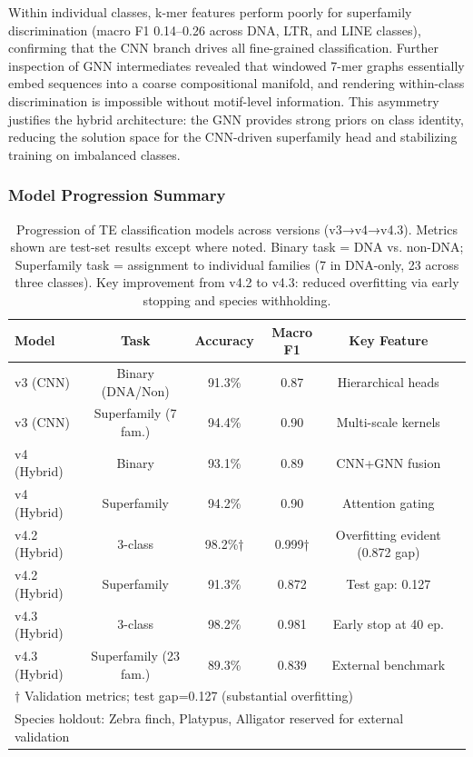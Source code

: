 \documentclass[12pt]{article}
\begin{document}
Within individual classes, k-mer features perform poorly for superfamily discrimination (macro F1 0.14--0.26 across DNA, LTR, and LINE classes), confirming that the CNN branch drives all fine-grained classification. Further inspection of GNN intermediates revealed that windowed 7-mer graphs essentially embed sequences into a coarse compositional manifold, and rendering within-class discrimination is impossible without motif-level information. This asymmetry justifies the hybrid architecture: the GNN provides strong priors on class identity, reducing the solution space for the CNN-driven superfamily head and stabilizing training on imbalanced classes.

\iffalse

\clearpage
\subsubsection{Model Progression Summary}

\FloatBarrier
\begin{table}[H]
\centering
\begin{tabular}{lccccc}
\hline
Model & Task & Accuracy & Macro F1 & Key Feature \\
\hline
v3 (CNN) & Binary (DNA/Non) & 91.3\% & 0.87 & Hierarchical heads \\
v3 (CNN) & Superfamily (7 fam.) & 94.4\% & 0.90 & Multi-scale kernels \\
v4 (Hybrid) & Binary & 93.1\% & 0.89 & CNN+GNN fusion \\
v4 (Hybrid) & Superfamily & 94.2\% & 0.90 & Attention gating \\
v4.2 (Hybrid) & 3-class & 98.2\%† & 0.999†  & Overfitting evident (0.872 gap) \\
v4.2 (Hybrid) & Superfamily & 91.3\% & 0.872 & Test gap: 0.127 \\
v4.3 (Hybrid) & 3-class & 98.2\% & 0.981 &  Early stop at 40 ep. \\
v4.3 (Hybrid) & Superfamily (23 fam.) & 89.3\% & 0.839 & External benchmark \\
\hline
\multicolumn{6}{l}{$\dagger$ Validation metrics; test gap=0.127 (substantial overfitting)} \\
\multicolumn{6}{l}{Species holdout: Zebra finch, Platypus, Alligator reserved for external validation}
\end{tabular}
\caption{Progression of TE classification models across versions (v3→v4→v4.3). Metrics shown are test-set results except where noted. Binary task = DNA vs. non-DNA; Superfamily task = assignment to individual families (7 in DNA-only, 23 across three classes). Key improvement from v4.2 to v4.3: reduced overfitting via early stopping and species withholding.}
\label{tab:model\_progression}
\end{table}
\end{document}
